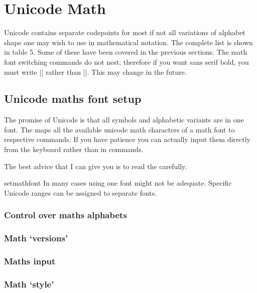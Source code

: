 
  
\chapter{Unicode Math}
Unicode contains separate codepoints for most if not all variations of alphabet
shape one may wish to use in mathematical notation. The complete list is shown
in table 5. Some of these have been covered in the previous sections.
The math font switching commands do not nest; therefore if you want sans
serif bold, you must write || rather than ||.
This may change in the future.

\section{Unicode maths font setup}

The promise of Unicode is that all symbols and alphabetic variants are in one font. The 
maps all the available unicode math characters of a math font to respective \latex commands. If you have patience you can actually input them directly from the keyboard rather than in commands.

The best advice that I can give you is to read the  carefully. 

\begin{docCommand} {setmathfont} {   }
In many cases using one font might not be adequate. Specific Unicode ranges can be assigned to separate fonts.
\end{docCommand}

\subsection{Control over maths alphabets}

\subsection{Math `versions'}

\subsection{Maths input}

\subsection{Math `style'}


